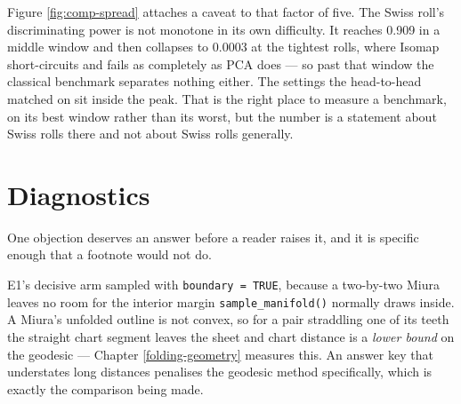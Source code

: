 \documentclass[
  british,
  a4paper,
]{book}
\begin{document}
Figure \ref{fig:comp-spread} attaches a caveat to that factor of five. The Swiss
roll's discriminating power is not monotone in its own difficulty. It reaches
0.909 in a middle window
and then collapses to
0.0003 at the tightest
rolls, where Isomap short-circuits and fails as completely as PCA does --- so past
that window the classical benchmark separates nothing either. The settings the
head-to-head matched on sit inside the peak. That is the right place to measure a
benchmark, on its best window rather than its worst, but the number is a
statement about Swiss rolls there and not about Swiss rolls generally.

\section{Diagnostics}\label{comp-diagnostics}

One objection deserves an answer before a reader raises it, and it is specific
enough that a footnote would not do.

E1's decisive arm sampled with \texttt{boundary\ =\ TRUE}, because a two-by-two Miura
leaves no room for the interior margin \texttt{sample\_manifold()} normally draws inside.
A Miura's unfolded outline is not convex, so for a pair straddling one of its
teeth the straight chart segment leaves the sheet and chart distance is a \emph{lower
bound} on the geodesic --- Chapter \ref{folding-geometry} measures this. An answer
key that understates long distances penalises the geodesic method specifically,
which is exactly the comparison being made.
\end{document}
